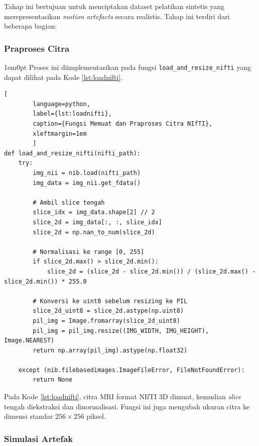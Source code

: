 Tahap ini bertujuan untuk menciptakan dataset pelatihan sintetis yang merepresentasikan \textit{motion artefacts} secara realistis. Tahap ini terdiri dari beberapa bagian:

\subsubsection{Praproses Citra}
\begin{adjustwidth}{1em}{0pt}
	\hspace{\parindent}Proses ini diimplementasikan pada fungsi \texttt{load\_and\_resize\_nifti} yang dapat dilihat pada Kode \ref{lst:loadnifti}.
	
	\begin{lstlisting}[
		language=python,
		label={lst:loadnifti},
		caption={Fungsi Memuat dan Praproses Citra NIfTI},
		xleftmargin=1em
		]
def load_and_resize_nifti(nifti_path):
	try:
		img_nii = nib.load(nifti_path)
		img_data = img_nii.get_fdata()
		
		# Ambil slice tengah
		slice_idx = img_data.shape[2] // 2
		slice_2d = img_data[:, :, slice_idx]
		slice_2d = np.nan_to_num(slice_2d)
		
		# Normalisasi ke range [0, 255]
		if slice_2d.max() > slice_2d.min():
			slice_2d = (slice_2d - slice_2d.min()) / (slice_2d.max() - slice_2d.min()) * 255.0
		
		# Konversi ke uint8 sebelum resizing ke PIL
		slice_2d_uint8 = slice_2d.astype(np.uint8)
		pil_img = Image.fromarray(slice_2d_uint8)
		pil_img = pil_img.resize((IMG_WIDTH, IMG_HEIGHT), Image.NEAREST)
		return np.array(pil_img).astype(np.float32)
	
	except (nib.filebasedimages.ImageFileError, FileNotFoundError):
		return None
	\end{lstlisting}
	
	Pada Kode \ref{lst:loadnifti}, citra MRI format NIfTI 3D dimuat, kemudian \textit{slice} tengah diekstraksi dan dinormalisasi. Fungsi ini juga mengubah ukuran citra ke dimensi standar $256 \times 256$ piksel.
\end{adjustwidth}

\subsubsection{Simulasi Artefak}

